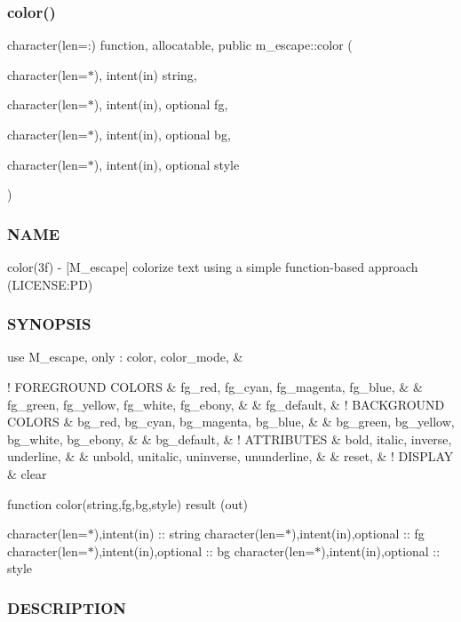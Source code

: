 \subsubsection{\texorpdfstring{color()}{color()}}
{\footnotesize\ttfamily character(len=\+:) function, allocatable, public m\+\_\+escape\+::color (\begin{DoxyParamCaption}\item[{character(len=$\ast$), intent(in)}]{string,  }\item[{character(len=$\ast$), intent(in), optional}]{fg,  }\item[{character(len=$\ast$), intent(in), optional}]{bg,  }\item[{character(len=$\ast$), intent(in), optional}]{style }\end{DoxyParamCaption})}



\subsubsection*{N\+A\+ME}

color(3f) -\/ \mbox{[}M\+\_\+escape\mbox{]} colorize text using a simple function-\/based approach (L\+I\+C\+E\+N\+SE\+:PD) \subsubsection*{S\+Y\+N\+O\+P\+S\+IS}

use M\+\_\+escape, only \+: color, color\+\_\+mode, \&

! F\+O\+R\+E\+G\+R\+O\+U\+ND C\+O\+L\+O\+RS \& fg\+\_\+red, fg\+\_\+cyan, fg\+\_\+magenta, fg\+\_\+blue, \& \& fg\+\_\+green, fg\+\_\+yellow, fg\+\_\+white, fg\+\_\+ebony, \& \& fg\+\_\+default, \& ! B\+A\+C\+K\+G\+R\+O\+U\+ND C\+O\+L\+O\+RS \& bg\+\_\+red, bg\+\_\+cyan, bg\+\_\+magenta, bg\+\_\+blue, \& \& bg\+\_\+green, bg\+\_\+yellow, bg\+\_\+white, bg\+\_\+ebony, \& \& bg\+\_\+default, \& ! A\+T\+T\+R\+I\+B\+U\+T\+ES \& bold, italic, inverse, underline, \& \& unbold, unitalic, uninverse, ununderline, \& \& reset, \& ! D\+I\+S\+P\+L\+AY \& clear

function color(string,fg,bg,style) result (out)

character(len=$\ast$),intent(in) \+:\+: string character(len=$\ast$),intent(in),optional \+:\+: fg character(len=$\ast$),intent(in),optional \+:\+: bg character(len=$\ast$),intent(in),optional \+:\+: style

\subsubsection*{D\+E\+S\+C\+R\+I\+P\+T\+I\+ON}

